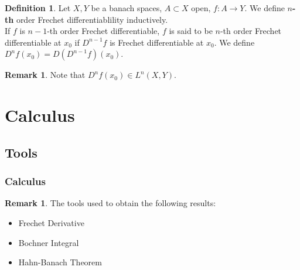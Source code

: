 \documentclass[notheorems]{beamer}
\theoremstyle{definition}
\newtheorem{defn}[definition]{Definition}
\theoremstyle{definition}
\newtheorem{rem}[definition]{Remark}
\begin{document}
\begin{frame}
\begin{defn}
Let $X, Y$ be a banach spaces, $A \subset X$ open, $f:A \rightarrow Y$. We define \textbf{$n$-th} order Frechet differentiablility inductively. \\
If $f$ is $n-1$-th order Frechet differentiable, $f$ is said to be $n$-th order Frechet differentiable at $x_0$ if $D^{n-1}f$ is Frechet differentiable at $x_0$. We define $D^nf(x_0) = D(D^{n-1}f)(x_0)$.   
\end{defn}
\pause

\begin{rem}
Note that $D^nf(x_0) \in L^n(X,Y)$. 
\end{rem}

\end{frame}







\section{Calculus} 

\subsection{Tools}
\begin{frame}
\frametitle{Calculus}

\begin{rem}
The tools used to obtain the following results: 
\pause
\begin{itemize}
\item Frechet Derivative
\pause
\item Bochner Integral
\pause
\item Hahn-Banach Theorem  
\end{itemize}
\end{rem}
\end{frame}
\end{document}
